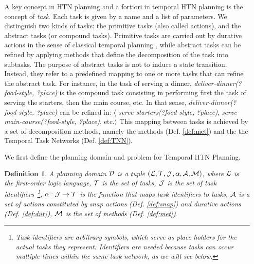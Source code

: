 \documentclass[letterpaper]{article} %
\newtheorem{definition}{Definition}
\begin{document}
 A key concept in HTN planning and a fortiori in temporal HTN planning is the concept of {\it task}. Each task is given by a name and a list of parameters. We distinguish two kinds of tasks: the  primitive tasks (also called actions), and the abstract tasks (or compound tasks).
 Primitive tasks are carried out by  durative actions in the sense of classical temporal planning \cite{fox03}, while abstract tasks can be refined by applying methods that define the decomposition of the task into subtasks. The purpose of abstract tasks is not to induce a state transition. Instead, they refer to a predefined mapping to one or more tasks that can refine the abstract task. For instance, in the task of serving a dinner, {\it deliver-dinner(?food-style, ?place)} is the compound task consisting in performing first the task of serving the starters, then the main course, etc. In that sense,  {\it deliver-dinner(?food-style, ?place)} can be refined in: $\langle$ {\it serve-starters(?food-style, ?place)},  {\it serve-main-course(?food-style, ?place)}, etc.$\rangle$ This mapping between tasks is achieved by a set of decomposition methods, namely the methods (Def. \ref{def:met}) and the the Temporal Task Networks (Def. \ref{def:TNN}).%

 

 We first define the planning domain and problem for Temporal HTN Planning.
 \begin{definition}
   A \emph{planning domain} $\cal{D}$ is a tuple $({\cal{L}}, {\cal{T}}, {\cal{J}}, \alpha, {\cal{A}}, {\cal{M}})$, where
   $\cal{L}$ is the first-order logic language,
   $\cal{T}$ is the set of tasks,
   $\cal{J}$ is the set of task identifiers~\footnote{Task identifiers are arbitrary symbols, which serve as place holders for the actual tasks they represent. Identifiers are needed because tasks can occur multiple times within the same task network, as we will see below.},
   $\alpha: {\cal{J}} \rightarrow {\cal{T}}$ is the function that maps task identifiers to tasks,
   ${\cal{A}}$ is a set of actions constituted by \emph{snap} actions (Def. \ref{def:snap}) and \emph{durative} actions (Def. \ref{def:dur}),
   $\cal{M}$ is the set of methods (Def. \ref{def:met}). %
 \end{definition}
\end{document}
